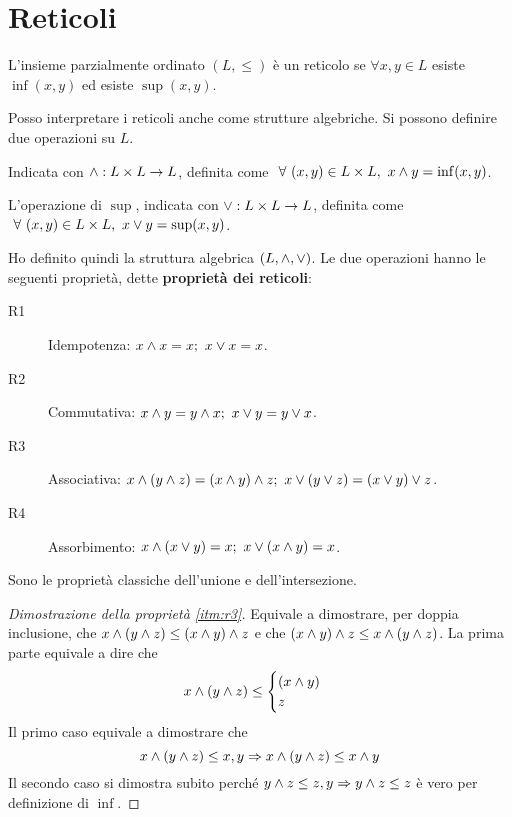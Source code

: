 \section{Reticoli}
\begin{defn}[Reticolo]
L'insieme parzialmente ordinato $(L, \leq)$ \`e un reticolo se $\forall x, y \in L $ esiste $\inf(x,y)$ ed esiste $\sup(x,y)$.
\end{defn}

Posso interpretare i reticoli anche come strutture algebriche. Si possono definire due operazioni su $L$. 

\begin{defn}
Indicata con $\wedge: L \times L \to L$, definita come $ \forall (x,y) \in L \times L , \ x \infop y = \inf(x,y) $.
\end{defn}
\begin{defn}
L'operazione di $\sup $, indicata con $ \vee: L \times L \to L$, definita come $\forall (x,y) \in L \times L , \ x \supop y = \sup(x,y)$.
\end{defn}

Ho definito quindi la struttura algebrica $(L, \wedge, \vee)$. Le due operazioni hanno le seguenti propriet\`a, dette \label{proprieta_dei_reticoli} \textbf{propriet\`a dei reticoli}:
\begin{description}
    \item[R1\label{itm:r1}] Idempotenza: $x \wedge x = x ; \ x \vee x = x$.
    \item [R2\label{itm:r2}] Commutativa: $x \wedge y = y \wedge x ; \ x \vee y = y \vee x$.
    \item [R3\label{itm:r3}] Associativa: $x \wedge ( y \wedge z) = (x \wedge y) \wedge z; \ x \vee ( y \vee z) = (x \vee y) \vee z$.
    \item [R4\label{itm:r4}] Assorbimento: $x \wedge (x \vee y) = x ; \ x \vee ( x \wedge y) = x$.
\end{description}
Sono le propriet\`a classiche dell'unione e dell'intersezione.

\begin{proof}[Dimostrazione della propriet\`a \ref{itm:r3}]
Equivale a dimostrare, per doppia inclusione, che $x \wedge ( y \wedge z) \leq (x \wedge y) \wedge z$ e che $(x \wedge y) \wedge z \leq x \wedge ( y \wedge z)$. La prima parte equivale a dire che
\[
x \wedge (y \wedge z) \leq 
\begin{cases}
(x \wedge y) \\
 z
 \end{cases}
\]
Il primo caso equivale a dimostrare che
\[
x \wedge (y \wedge z) \leq x, y \Rightarrow x \wedge (y \wedge z) \leq x \wedge y
\]
Il secondo caso si dimostra subito perch\'e $y \wedge z \leq z, y \Rightarrow y \wedge z \leq z$ \`e vero per definizione di $\inf$. 
\end{proof}

